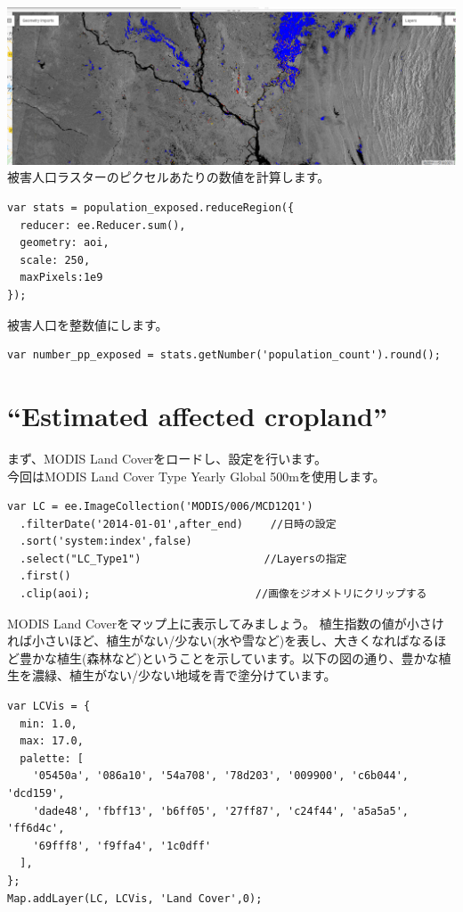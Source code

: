 \documentclass[
]{book}
\begin{document}
\includegraphics{images/exposedp.png}
被害人口ラスターのピクセルあたりの数値を計算します。

\begin{verbatim}
var stats = population_exposed.reduceRegion({
  reducer: ee.Reducer.sum(),
  geometry: aoi,
  scale: 250,
  maxPixels:1e9 
});
\end{verbatim}

被害人口を整数値にします。

\begin{verbatim}
var number_pp_exposed = stats.getNumber('population_count').round();
\end{verbatim}

\hypertarget{estimated-affected-cropland}{%
\section{``Estimated affected cropland''}\label{estimated-affected-cropland}}

まず、MODIS Land Coverをロードし、設定を行います。\\
今回はMODIS Land Cover Type Yearly Global 500mを使用します。

\begin{verbatim}
var LC = ee.ImageCollection('MODIS/006/MCD12Q1')
  .filterDate('2014-01-01',after_end) 　　//日時の設定
  .sort('system:index',false)　　　　　 　
  .select("LC_Type1")　　　　           　//Layersの指定
  .first()                                
  .clip(aoi);　　　　　　　　           　//画像をジオメトリにクリップする
\end{verbatim}

MODIS Land Coverをマップ上に表示してみましょう。
植生指数の値が小さければ小さいほど、植生がない/少ない(水や雪など)を表し、大きくなればなるほど豊かな植生(森林など)ということを示しています。以下の図の通り、豊かな植生を濃緑、植生がない/少ない地域を青で塗分けています。

\begin{verbatim}
var LCVis = {
  min: 1.0,
  max: 17.0,
  palette: [
    '05450a', '086a10', '54a708', '78d203', '009900', 'c6b044', 'dcd159',
    'dade48', 'fbff13', 'b6ff05', '27ff87', 'c24f44', 'a5a5a5', 'ff6d4c',
    '69fff8', 'f9ffa4', '1c0dff'
  ],
};
Map.addLayer(LC, LCVis, 'Land Cover',0);
\end{verbatim}
\end{document}
